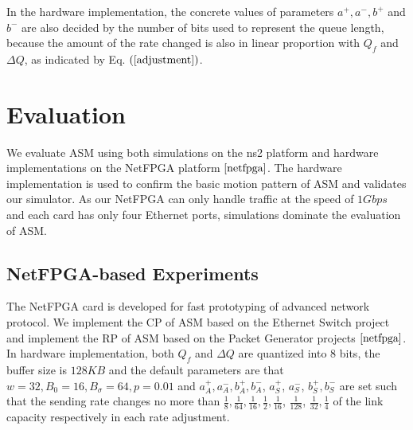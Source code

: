 \documentclass{sig-alternate-10pt}
\begin{document}
In the hardware implementation, the concrete values of parameters $a^+, a^-, b^+$ and $b^-$ are also decided by the number of bits used to represent the queue length, because the amount of the rate changed is also in linear proportion with $Q_f$ and $\Delta Q$, as indicated by Eq. $(\ref{adjustment})$.


\iffalse
\textbf{Quantization}
In the hardware implementation, the feedback information is quantized into several bits. In general, the quantization is linearized. For example, when the buffer size is $128KB$ and the number of bits used to represent the instantaneous queue length is $7$, the quantized queue length changes $1$ when the real queue length changes $1KB$. However, this quantized result is not balanced to the rate adjustment algorithm. Assume the target queue length is $4KB$, the quantized queue length is smaller than the target point only when it takes value in $\{0,1,2,3\}$, while larger than the target point when it takes value in $\{5,6,\dots,127\}$. It is better to let the rate adjustment algorithm see that quantized queue length is smaller than the target point when it takes value in $\{0,1,\dots,63\}$, and vice versa. Or else, in the rate adjustment, the parameters need to be very small for the condition that the queue length is smaller than the target point, and vice versa.\\
\fi


\section{Evaluation}
We evaluate ASM using both simulations on the ns2 platform and hardware implementations on the NetFPGA platform $\cite{netfpga}$. The hardware implementation is used to confirm the basic motion pattern of ASM and validates our simulator. As our NetFPGA can only handle traffic at the speed of $1Gbps$ and each card has only four Ethernet ports, simulations dominate the evaluation of ASM.


\subsection{NetFPGA-based Experiments}
The NetFPGA card is developed for fast prototyping of advanced network protocol. We implement the CP of ASM based on the Ethernet Switch project and implement the RP of ASM based on the Packet Generator projects $\cite{netfpga}$. In hardware implementation, both $Q_f$ and $\Delta Q$ are quantized into 8 bits, the buffer size is $128KB$ and the default parameters are that $w=32, B_0=16, B_{\sigma}=64, p=0.01$ and $a^+_A, a^-_A, b^+_A, b^-_A$, $a^+_S$, $a^-_S$, $b^+_S, b^-_S$ are set such that the sending rate changes no more than $\frac{1}{8}, \frac{1}{64}, \frac{1}{16}, \frac{1}{2}, \frac{1}{16}$, $\frac{1}{128}$, $\frac{1}{32},  \frac{1}{4}$ of the link capacity respectively in each rate adjustment. 
\end{document}
